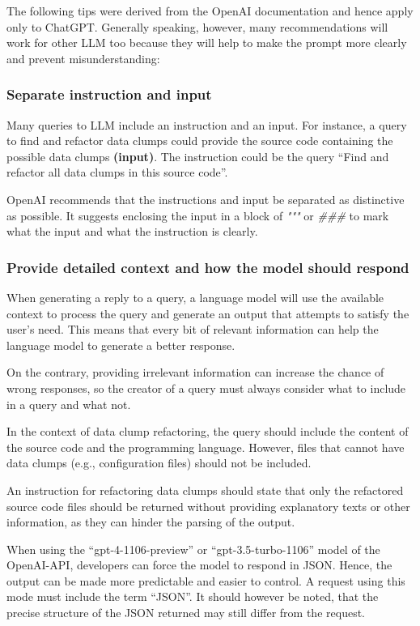 The following tips were derived from the OpenAI documentation \cite{ChatGPT_url} and hence apply only to ChatGPT. Generally speaking, however, many recommendations will work for other \ac{LLM} too because they will help to make the prompt more clearly and prevent misunderstanding:

\subsubsection{Separate instruction and input}
Many queries to \ac{LLM} include an instruction and an input. For instance, a query to find and refactor data clumps could provide the source code containing the possible data clumps \textbf{(input)}. The instruction could be the query \enquote{Find and refactor all data clumps in this source code}. 

OpenAI recommends that the instructions and input be separated as distinctive as possible. It suggests enclosing the input in a block of \textit{"""} or \textit{\#\#\#} to mark what the input and what the instruction is clearly.

\subsubsection{Provide detailed context and how the model should respond}

When generating a reply to a query, a language model will use the available context to process the query and generate an output that attempts to satisfy the user's need. This means that every bit of relevant information can help the language model to generate a better response.

On the contrary, providing irrelevant information can increase the chance of wrong responses, so the creator of a query must always consider what to include in a query and what not. 

In the context of data clump refactoring, the query should include the content of the source code and the programming language. However, files that cannot have data clumps (e.g., configuration files) should not be included.

An instruction for refactoring data clumps should state that only the refactored source code files should be returned without providing explanatory texts or other information, as they can hinder the parsing of the output. 

When using the \enquote{gpt-4-1106-preview} or \enquote{gpt-3.5-turbo-1106} model of the OpenAI-\ac{API}, developers can force the model to respond in \ac{JSON}. Hence, the output can be made more predictable and easier to control. A request using this mode must include the term \enquote{\ac{JSON}}. It should however be noted, that the precise structure of the \ac{JSON} returned may still differ from the request. 

